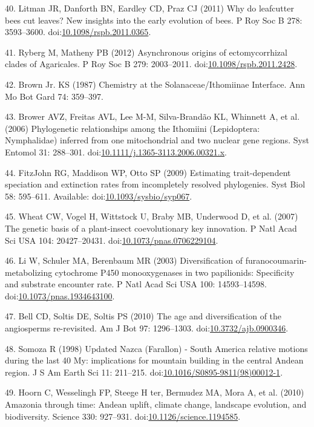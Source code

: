 \documentclass[10pt]{article}
\begin{document}
40. Litman JR, Danforth BN, Eardley CD, Praz CJ (2011) Why do leafcutter
bees cut leaves? New insights into the early evolution of bees. P Roy
Soc B 278: 3593--3600.
doi:\href{http://dx.doi.org/10.1098/rspb.2011.0365}{10.1098/rspb.2011.0365}.

41. Ryberg M, Matheny PB (2012) Asynchronous origins of ectomycorrhizal
clades of Agaricales. P Roy Soc B 279: 2003--2011.
doi:\href{http://dx.doi.org/10.1098/rspb.2011.2428}{10.1098/rspb.2011.2428}.

42. Brown Jr. KS (1987) Chemistry at the Solanaceae/Ithomiinae
Interface. Ann Mo Bot Gard 74: 359--397.

43. Brower AVZ, Freitas AVL, Lee M-M, Silva-Brand\~ao KL, Whinnett A, et
al. (2006) Phylogenetic relationships among the Ithomiini (Lepidoptera:
Nymphalidae) inferred from one mitochondrial and two nuclear gene
regions. Syst Entomol 31: 288--301.
doi:\href{http://dx.doi.org/10.1111/j.1365-3113.2006.00321.x}{10.1111/j.1365-3113.2006.00321.x}.

44. FitzJohn RG, Maddison WP, Otto SP (2009) Estimating trait-dependent
speciation and extinction rates from incompletely resolved phylogenies.
Syst Biol 58: 595--611. Available:
doi:\href{http://dx.doi.org/10.1093/sysbio/syp067}{10.1093/sysbio/syp067}.

45. Wheat CW, Vogel H, Wittstock U, Braby MB, Underwood D, et al. (2007)
The genetic basis of a plant-insect coevolutionary key innovation. P
Natl Acad Sci USA 104: 20427--20431.
doi:\href{http://dx.doi.org/10.1073/pnas.0706229104}{10.1073/pnas.0706229104}.

46. Li W, Schuler MA, Berenbaum MR (2003) Diversification of
furanocoumarin-metabolizing cytochrome P450 monooxygenases in two
papilionids: Specificity and substrate encounter rate. P Natl Acad Sci
USA 100: 14593--14598.
doi:\href{http://dx.doi.org/10.1073/pnas.1934643100}{10.1073/pnas.1934643100}.

47. Bell CD, Soltis DE, Soltis PS (2010) The age and diversification of
the angiosperms re-revisited. Am J Bot 97: 1296--1303.
doi:\href{http://dx.doi.org/10.3732/ajb.0900346}{10.3732/ajb.0900346}.

48. Somoza R (1998) Updated Nazca (Farallon) - South America relative
motions during the last 40 My: implications for mountain building in the
central Andean region. J S Am Earth Sci 11: 211--215.
doi:\href{http://dx.doi.org/10.1016/S0895-9811(98)00012-1}{10.1016/S0895-9811(98)00012-1}.

49. Hoorn C, Wesselingh FP, Steege H ter, Bermudez MA, Mora A, et al.
(2010) Amazonia through time: Andean uplift, climate change, landscape
evolution, and biodiversity. Science 330: 927--931.
doi:\href{http://dx.doi.org/10.1126/science.1194585}{10.1126/science.1194585}.
\end{document}
